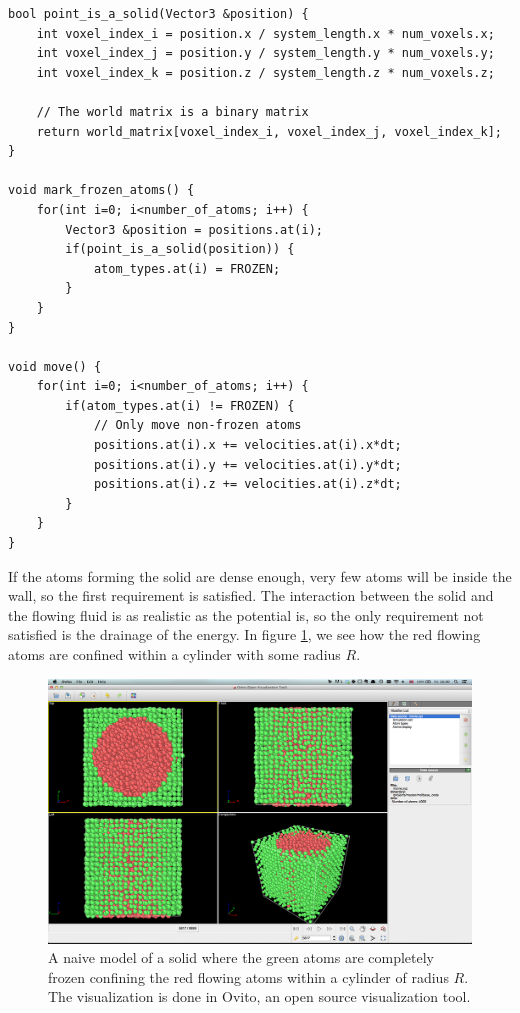 \begin{lstlisting}[caption=Example code showing how to mark atoms within a solid., label=lst:md_simple_solid]
bool point_is_a_solid(Vector3 &position) {
	int voxel_index_i = position.x / system_length.x * num_voxels.x;
	int voxel_index_j = position.y / system_length.y * num_voxels.y;
	int voxel_index_k = position.z / system_length.z * num_voxels.z;

	// The world matrix is a binary matrix
	return world_matrix[voxel_index_i, voxel_index_j, voxel_index_k];
}

void mark_frozen_atoms() {
	for(int i=0; i<number_of_atoms; i++) {
		Vector3 &position = positions.at(i);
		if(point_is_a_solid(position)) {
			atom_types.at(i) = FROZEN;
		}
	}
}

void move() {
	for(int i=0; i<number_of_atoms; i++) {
		if(atom_types.at(i) != FROZEN) {
			// Only move non-frozen atoms
			positions.at(i).x += velocities.at(i).x*dt;
			positions.at(i).y += velocities.at(i).y*dt;
			positions.at(i).z += velocities.at(i).z*dt;
		}
	}
}
\end{lstlisting}
If the atoms forming the solid are dense enough, very few atoms will be inside the wall, so the first requirement is satisfied. The interaction between the solid and the flowing fluid is as realistic as the potential is, so the only requirement not satisfied is the drainage of the energy. In figure \ref{fig:md_simple_solid}, we see how the red flowing atoms are confined within a cylinder with some radius $R$. 

\begin{figure}[h]
\begin{center}
\includegraphics[width=1.0\textwidth, trim=0cm 0cm 0cm 0cm, clip]{MD/figures/solid_model.png}
\end{center}
\caption{A naive model of a solid where the green atoms are completely frozen confining the red flowing atoms within a cylinder of radius $R$. The visualization is done in Ovito, an open source visualization tool.}
\label{fig:md_simple_solid}
\end{figure}

